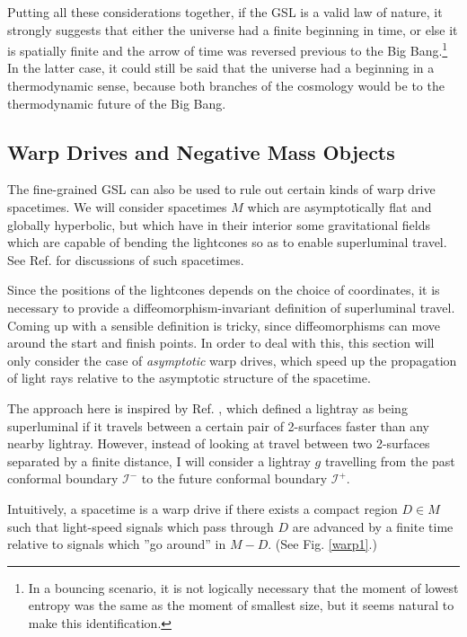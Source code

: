 \documentclass{article}
\begin{document}
Putting all these considerations together, if the GSL is a valid law of nature, it strongly suggests that either the universe had a finite beginning in time, or else it is spatially finite and the arrow of time was reversed previous to the Big Bang.\footnote{In a bouncing scenario, it is not logically necessary that the moment of lowest entropy was the same as the moment of smallest size, but it seems natural to make this identification.}  In the latter case, it could still be said that the universe had a beginning in a thermodynamic sense, because both branches of the cosmology would be to the thermodynamic future of the Big Bang.

\subsection{Warp Drives and Negative Mass Objects}\label{warp}

The fine-grained GSL can also be used to rule out certain kinds of warp drive spacetimes.  We will consider spacetimes $M$ which are asymptotically flat and globally hyperbolic, but which have in their interior some gravitational fields which are capable of bending the lightcones so as to enable superluminal travel.  See Ref. \cite{warps} for discussions of such spacetimes.

Since the positions of the lightcones depends on the choice of coordinates, it is necessary to provide a diffeomorphism-invariant definition of superluminal travel.  Coming up with a sensible definition is tricky, since diffeomorphisms can move around the start and finish points.  In order to deal with this, this section will only consider the case of \textit{asymptotic} warp drives, which speed up the propagation of light rays relative to the asymptotic structure of the spacetime.  

The approach here is inspired by Ref. \cite{olum}, which defined a lightray as being superluminal if it travels between a certain pair of 2-surfaces faster than any nearby lightray.  However, instead of looking at travel between two 2-surfaces separated by a finite distance, I will consider a lightray $g$ travelling from the past conformal boundary $\mathcal{I}^-$ to the future conformal boundary $\mathcal{I}^+$.

Intuitively, a spacetime is a warp drive if there exists a compact region $D \in M$ such that light-speed signals which pass through $D$ are advanced by a finite time relative to signals which ''go around'' in $M - D$.  (See Fig. \ref{warp1}.)
\end{document}

